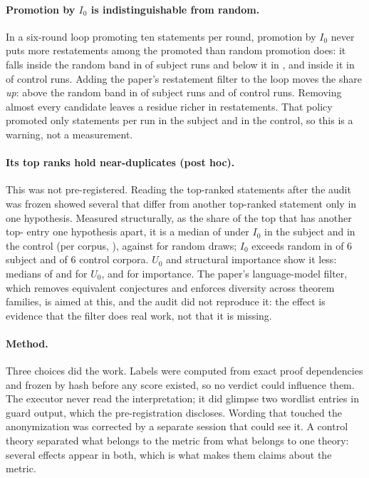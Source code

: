 \documentclass[11pt,a4paper]{article}
\newcommand{\Iz}{I_0}
\newcommand{\Uz}{U_0}
\begin{document}
\paragraph{Promotion by $\Iz$ is indistinguishable from random.}
In a six-round loop promoting ten statements per round, promotion by $\Iz$
never puts more restatements among the promoted than random promotion does: it
falls inside the random band in \subjectLoopIWithin{} of \subjectRuns{} subject
runs and below it in \subjectLoopIBelow, and inside it in \controlLoopIWithin{} of
\controlRuns{} control runs. Adding the paper's restatement filter to the loop
moves the share \emph{up}: above the random band in \subjectLoopFiltAbove{} of
\subjectRuns{} subject runs and \controlLoopFiltAbove{} of \controlRuns{} control
runs. Removing almost every candidate leaves a residue richer in restatements.
That policy promoted only \subjectFiltPromoted{} statements per run in the
subject and \controlFiltPromoted{} in the control, so this is a warning, not a
measurement.

\paragraph{Its top ranks hold near-duplicates (post hoc).}
This was not pre-registered. Reading the top-ranked statements after the audit
was frozen showed several that differ from another top-ranked statement only in
one hypothesis. Measured structurally, as the share of the top \nearDupK{} that
has another top-\nearDupK{} entry one hypothesis apart, it is a median of
\subjectNearDupIZeroMedian{} under $\Iz$ in the subject and
\controlNearDupIZeroMedian{} in the control (per corpus, \controlNearDupIZero),
against \subjectNearDupRandMedian{} for random draws; $\Iz$ exceeds random in
\subjectNearDupAboveRandom{} of 6 subject and \controlNearDupAboveRandom{} of 6
control corpora. $\Uz$ and structural importance show it less: medians of
\subjectNearDupUZeroMedian{} and \controlNearDupUZeroMedian{} for $\Uz$,
\subjectNearDupImpMedian{} and \controlNearDupImpMedian{} for importance. The
paper's language-model filter, which removes equivalent conjectures and
enforces diversity across theorem families, is aimed at this, and the audit did
not reproduce it: the effect is evidence that the filter does real work, not
that it is missing.

\paragraph{Method.}
Three choices did the work. Labels were computed from exact proof dependencies
and frozen by hash before any score existed, so no verdict could influence them. The
executor never read the interpretation; it did glimpse two wordlist entries in
guard output, which the pre-registration discloses. Wording that touched the
anonymization was corrected by a separate session that could see it. A control
theory separated what belongs to the metric from what belongs to one theory:
several effects appear in both, which is what makes them claims about the
metric.
\end{document}
